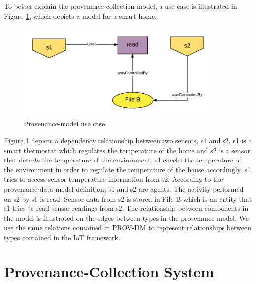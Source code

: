 To better explain the provenance-collection model, a use case is illustrated in Figure \ref{prov_model}, which depicts a model for a smart home.



\begin{figure}[h]
\begin{center}

\includegraphics[width=4.0in]{prov_model_usecase.png}    
\end{center}
\caption{Provenance-model use case}
\label{prov_model}
\end{figure}



Figure \ref{prov_model}  depicts a dependency relationship between two sensors, s1 and s2. s1 is a smart thermostat which regulates the temperature of the home and s2 is a sensor that detects the temperature of the environment. s1 checks the temperature of the environment in order to regulate the temperature of the house accordingly. s1 tries to access sensor temperature information from s2. According to the provenance data model  definition, s1 and s2 are agents. The activity performed on s2 by s1 is read. Sensor data from s2 is stored in File B which is  an entity that s1 tries to read sensor readings from s2. The relationship between components in the model is illustrated on the edges between types in the provenance model. We use the same relations contained in PROV-DM to represent relationships between types contained in the IoT framework.




\section{Provenance-Collection System}

